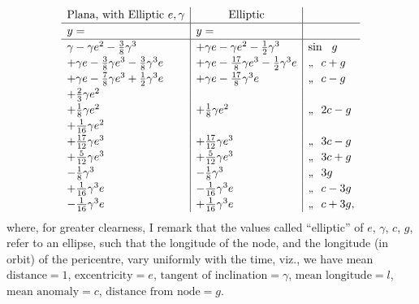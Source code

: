 \documentclass[11pt]{article}
\begin{document}
\[
\renewcommand{\arraystretch}{1.15}
\begin{array}{l|l|l}
\multicolumn{1}{c|}{\text{Plana, with Elliptic } e, \gamma}
& \multicolumn{1}{c|}{\text{Elliptic}}
& \\ \hline
y = & y = & \\
\hline
\gamma - \gamma e^{2} - \tfrac{3}{8}\gamma^{3}
   & + \gamma e - \gamma e^{2} - \tfrac{1}{2}\gamma^{3} & \sin\ \ g \\
+ \gamma e - \tfrac{3}{8}\gamma e^{3} - \tfrac{3}{8}\gamma^{3}e
   & + \gamma e - \tfrac{17}{8}\gamma e^{3} - \tfrac{1}{2}\gamma^{3}e & \text{,,}\ \ c + g \\
+ \gamma e - \tfrac{7}{8}\gamma e^{3} + \tfrac{1}{2}\gamma^{3}e
   & + \gamma e - \tfrac{17}{8}\gamma^{3}e & \text{,,}\ \ c - g \\
+ \tfrac{2}{3}\gamma e^{2} & & \\
+ \tfrac{1}{8}\gamma e^{2} & + \tfrac{1}{8}\gamma e^{2} & \text{,,}\ \ 2c - g \\
+ \tfrac{1}{16}\gamma e^{2} & & \\
+ \tfrac{17}{12}\gamma e^{3} & + \tfrac{17}{12}\gamma e^{3} & \text{,,}\ \ 3c - g \\
+ \tfrac{5}{12}\gamma e^{3} & + \tfrac{5}{12}\gamma e^{3} & \text{,,}\ \ 3c + g \\
- \tfrac{1}{8}\gamma^{3} & - \tfrac{1}{8}\gamma^{3} & \text{,,}\ \ 3g \\
+ \tfrac{1}{16}\gamma^{3}e & - \tfrac{1}{16}\gamma^{3}e & \text{,,}\ \ c - 3g \\
- \tfrac{1}{16}\gamma^{3}e & + \tfrac{1}{16}\gamma^{3}e & \text{,,}\ \ c + 3g,
\end{array}
\]
where, for greater clearness, I remark that the values called
``elliptic'' of $e$, $\gamma$, $c$, $g$, refer to an ellipse, such
that the longitude of the node, and the longitude (in orbit) of the
pericentre, vary uniformly with the time, viz., we have mean
$\text{distance} = 1$, $\text{excentricity} = e$, $\text{tangent of inclination} = \gamma$,
$\text{mean longitude} = l$, $\text{mean anomaly} = c$, $\text{distance from node} = g$.
\end{document}
